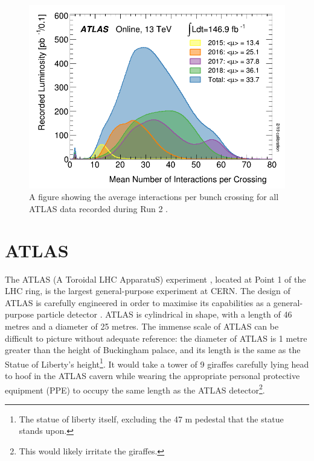 \documentclass[12pt,a4paper,epsf,portrait,times,epsfig]{report}
\begin{document}
		\begin{figure}
			\centering
			\includegraphics[scale=0.4]{ATLAS_Pileup_Run2.png}
			\caption{A figure showing the average interactions per bunch crossing for all ATLAS data recorded during Run 2 \cite{ATLASLumiPublic}.}
			\label{Fig:ATLASPileup}
		\end{figure}

		\section{ATLAS}

		The ATLAS (A Toroidal LHC ApparatuS) experiment \cite{ATLAS_Collab}, located at Point 1 of the LHC ring, is the largest general-purpose experiment at CERN. The design of ATLAS is carefully engineered in order to maximise its capabilities as a general-purpose particle detector \cite{ATLAS-TDR-01, ATLAS-TDR-02, Article:ATLASDesignPaper}. ATLAS is cylindrical in shape, with a length of 46 metres and a diameter of 25 metres. The immense scale of ATLAS can be difficult to picture without adequate reference: the diameter of ATLAS is 1 metre greater than the height of Buckingham palace, and its length is the same as the Statue of Liberty's height\footnote{The statue of liberty itself, excluding the 47 m pedestal that the statue stands upon.}. It would take a tower of 9 giraffes carefully lying head to hoof in the ATLAS cavern while wearing the appropriate personal protective equipment (PPE) to occupy the same length as the ATLAS detector\footnote{This would likely irritate the giraffes.}. 

\end{document}
